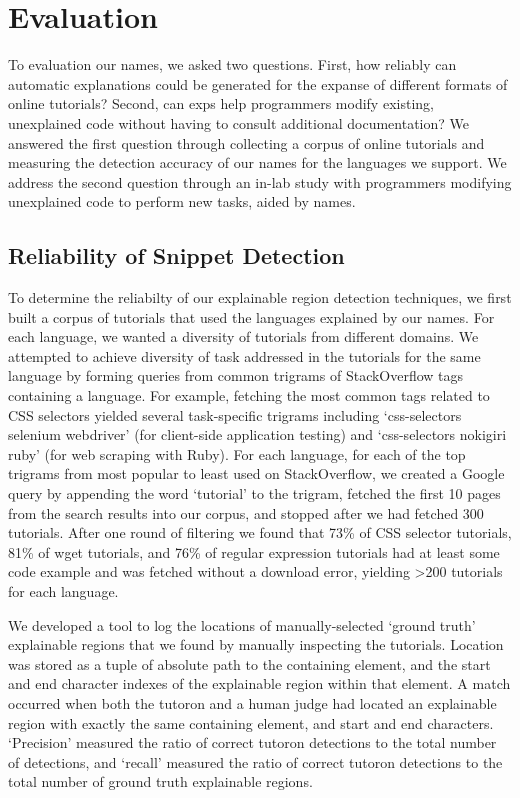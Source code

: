\section{Evaluation}

\begin{changes}

To evaluation our \glspl{name}, we asked two questions.
First, how reliably can automatic explanations could be generated for the expanse of different formats of online tutorials?
Second, can \glspl{exp} help programmers modify existing, unexplained code without having to consult additional documentation?
We answered the first question through collecting a corpus of online tutorials and measuring the detection accuracy of our \glspl{name} for the languages we support.
We address the second question through an in-lab study with programmers modifying unexplained code to perform new tasks, aided by \glspl{name}.

\subsection{Reliability of Snippet Detection}

To determine the reliabilty of our explainable region detection techniques, we first built a corpus of tutorials that used the languages explained by our \glspl{name}.
For each language, we wanted a diversity of tutorials from different domains.
We attempted to achieve diversity of task addressed in the tutorials for the same language by forming queries from common trigrams of StackOverflow tags containing a language.
For example, fetching the most common tags related to CSS selectors yielded several task-specific trigrams including `css-selectors selenium webdriver' (for client-side application testing) and `css-selectors nokigiri ruby' (for web scraping with Ruby).
For each language, for each of the top trigrams from most popular to least used on StackOverflow, we created a Google query by appending the word `tutorial' to the trigram, fetched the first 10 pages from the search results into our corpus, and stopped after we had fetched 300 tutorials.
After one round of filtering we found that 73\% of CSS selector tutorials, 81\% of wget tutorials, and 76\% of regular expression tutorials had at least some code example and was fetched without a download error, yielding >200 tutorials for each language.

We developed a tool to log the locations of manually-selected `ground truth' explainable regions that we found by manually inspecting the tutorials.
Location was stored as a tuple of absolute path to the containing element, and the start and end character indexes of the explainable region within that element.
A match occurred when both the tutoron and a human judge had located an explainable region with exactly the same containing element, and start and end characters.  
`Precision' measured the ratio of correct tutoron detections to the total number of detections, and `recall' measured the ratio of correct tutoron detections to the total number of ground truth explainable regions.


\end{changes}
